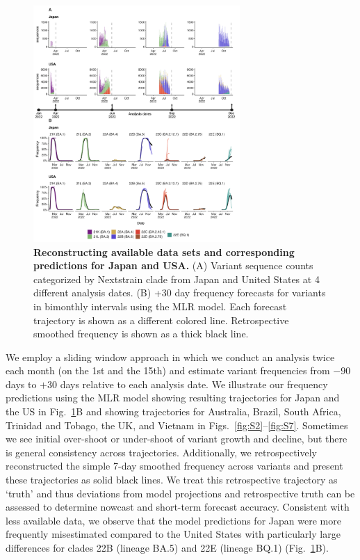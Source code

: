\begin{figure}[tb!]
	\centering
	\includegraphics[width=0.70\textwidth]{figures/dynamic_est_env.png}
	\caption[\textbf{Reconstructing available data sets and corresponding predictions for Japan and USA.}]{
		\textbf{Reconstructing available data sets and corresponding predictions for Japan and USA.}
		(A) Variant sequence counts categorized by Nextstrain clade from Japan and United States at 4 different analysis dates.
		(B) +30 day frequency forecasts for variants in bimonthly intervals using the MLR model.
		Each forecast trajectory is shown as a different colored line.
		Retrospective smoothed frequency is shown as a thick black line.
	}
	\label{fig:Fig1}
\end{figure}

We employ a sliding window approach in which we conduct an analysis twice each month (on the 1st and the 15th) and estimate variant frequencies from $-90$ days to $+30$ days relative to each analysis date.
We illustrate our frequency predictions using the MLR model showing resulting trajectories for Japan and the US in Fig.~\ref{fig:Fig1}B and showing trajectories for Australia, Brazil, South Africa, Trinidad and Tobago, the UK, and Vietnam in Figs.~\ref{fig:S2}--\ref{fig:S7}.
Sometimes we see initial over-shoot or under-shoot of variant growth and decline, but there is general consistency across trajectories.
Additionally, we retrospectively reconstructed the simple 7-day smoothed frequency across variants and present these trajectories as solid black lines.
We treat this retrospective trajectory as `truth' and thus deviations from model projections and retrospective truth can be assessed to determine nowcast and short-term forecast accuracy.
Consistent with less available data, we observe that the model predictions for Japan were more frequently misestimated compared to the United States with particularly large differences for clades 22B (lineage BA.5) and 22E (lineage BQ.1) (Fig.~\ref{fig:Fig1}B).



